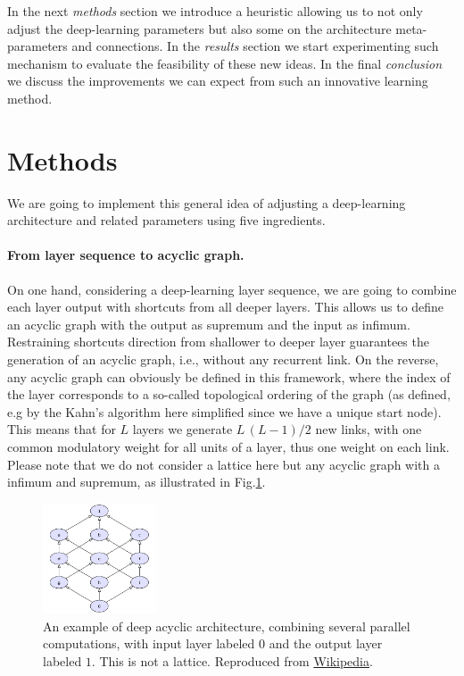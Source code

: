 \documentclass[twocolumn]{article}
\begin{document}
In the next {\em methods} section we introduce a heuristic allowing us to not only adjust the deep-learning parameters but also some on the architecture meta-parameters and connections. In the {\em results} section we start experimenting such mechanism to evaluate the feasibility of these new ideas. In the final {\em conclusion} we discuss the improvements we can expect from such an innovative learning method.

\section*{Methods}

We are going to implement this general idea of adjusting a deep-learning architecture and related parameters using five ingredients.

\paragraph*{From layer sequence to acyclic graph.}

On one hand, considering a deep-learning layer sequence, we are going to combine each layer output with shortcuts from all deeper layers.  This allows us to define an acyclic graph with the output as supremum and the input as infimum. Restraining shortcuts direction from shallower to deeper layer guarantees the generation of an acyclic graph, i.e., without any recurrent link. On the reverse, any acyclic graph can obviously be defined in this framework, where the index of the layer corresponds to a so-called topological ordering of the graph (as defined, e.g by the Kahn's algorithm here simplified since we have a unique start node). This means that for $L$ layers we generate $L \, (L-1)/2$ new links, with one common modulatory weight for all units of a layer, thus one weight on each link. Please note that we do not consider a lattice here but any acyclic graph with a infimum and supremum, as illustrated in Fig.\ref{acyclicgraph}.

\begin{figure}
\centering
\includegraphics[width=0.3\textwidth]{img/acyclicgraph}
\caption{An example of deep acyclic architecture, combining several parallel computations, with input layer labeled $0$ and the output layer labeled $1$. This is not a lattice. Reproduced from \href{https://en.wikipedia.org/wiki/Lattice\_\%28order\%29\#/media/File:Pow3nonlattice.svg}{Wikipedia}.}
\label{acyclicgraph}
\end{figure}
\end{document}

